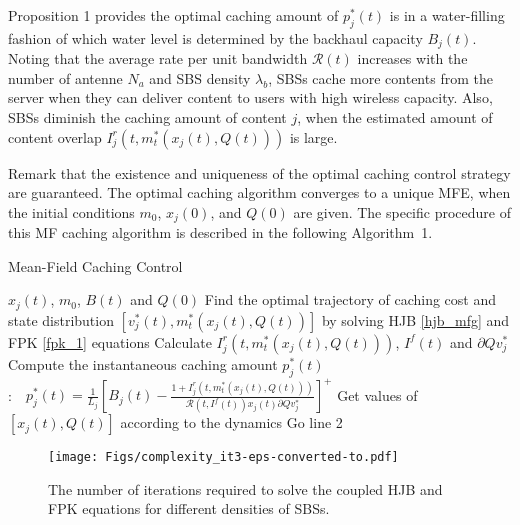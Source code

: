 \documentclass{book}
\begin{document}
    
    
    Proposition 1 provides the optimal caching amount of $p_{j}^*(t)$ is in a water-filling fashion of which water level is determined by the backhaul capacity $B_j(t)$. Noting that the average rate per unit bandwidth $\mathcal{R}(t)$ increases with the number of antenne $N_a$ and SBS density $\lambda_b$, SBSs cache more contents from the server when they can deliver content to users with high wireless capacity. 
    Also, SBSs diminish the caching amount of content $j$, when the estimated amount of content overlap $I^r_j(t,m^*_t(x_j(t),Q(t)))$ is large.
    
    
    Remark that the existence and uniqueness of the optimal caching control strategy are guaranteed. The optimal caching algorithm converges to a unique MFE, when the initial conditions $m_0$, $x_j(0)$, and $Q(0)$ are given.
     The specific procedure of this MF caching algorithm is described in the following Algorithm~1. 


     \begin{algorithm}
        \centering
        \caption{Mean-Field Caching Control}\label{euclid}
        \begin{algorithmic}[1]
        \REQUIRE $x_j(t)$, $m_0$, $B(t)$ and $Q(0)$
        \STATE  Find the optimal trajectory of caching cost and state distribution $[v_j^*(t),m_t^*(x_j(t),Q(t))]$ by solving HJB \eqref{hjb_mfg} and FPK \eqref{fpk_1} equations \vskip 3pt
        \STATE Calculate  $I_j^r(t,m_t^*(x_j(t),\!Q(t)))$, $I^f(t)$ and $\partial{\scriptscriptstyle{Q}}{v^*_{j}}$
         \vskip 3pt
        \STATE Compute the instantaneous caching amount $p_{j}^*(t)$\\ :$\quad p_{j}^*(t)=\frac{1}{L_j}\left[B_{j}(t)- \frac{1+I^r_j(t,m^*_t(x_j(t),Q(t)))}{\mathcal{R}(t,I^f(t)) x_j(t)\partial{\scriptscriptstyle 
         {Q}}{v^*_{j}}}    \right]^+$
         \vskip 3pt
        \STATE Get values of $[x_j(t),Q(t)]$  according to the dynamics 
        \STATE Go line 2
        \end{algorithmic}
        \end{algorithm}


        \begin{figure}\centering
            \texttt{[image: Figs/complexity\_it3-eps-converted-to.pdf]}   %
            \caption{\small{The number of iterations required to solve the coupled HJB and FPK equations for different densities of SBSs.}  }\label{complexity_it}
            \end{figure}
            
\end{document}
